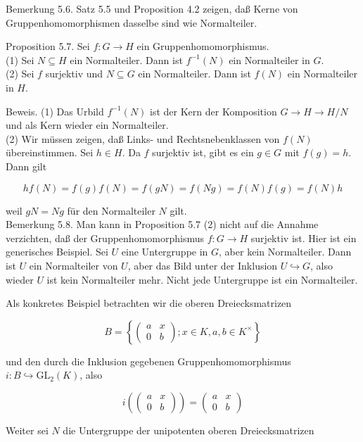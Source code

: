 \documentclass[10pt, letterpaper]{article}
\begin{document}
Bemerkung 5.6. Satz 5.5 und Proposition 4.2 zeigen, daß Kerne von Gruppenhomomorphismen dasselbe sind wie Normalteiler.

Proposition 5.7. Sei $f: G \rightarrow H$ ein Gruppenhomomorphismus.\\
(1) Sei $N \subseteq H$ ein Normalteiler. Dann ist $f^{-1}(N)$ ein Normalteiler in $G$.\\
(2) Sei $f$ surjektiv und $N \subseteq G$ ein Normalteiler. Dann ist $f(N)$ ein Normalteiler in $H$.

Beweis. (1) Das Urbild $f^{-1}(N)$ ist der Kern der Komposition $G \rightarrow H \rightarrow H / N$ und als Kern wieder ein Normalteiler.\\
(2) Wir müssen zeigen, daß Links- und Rechtsnebenklassen von $f(N)$ übereinstimmen. Sei $h \in H$. Da $f$ surjektiv ist, gibt es ein $g \in G$ mit $f(g)=h$. Dann gilt

$$
h f(N)=f(g) f(N)=f(g N)=f(N g)=f(N) f(g)=f(N) h
$$

weil $g N=N g$ für den Normalteiler $N$ gilt.\\
Bemerkung 5.8. Man kann in Proposition 5.7 (2) nicht auf die Annahme verzichten, daß der Gruppenhomomorphismus $f: G \rightarrow H$ surjektiv ist. Hier ist ein generisches Beispiel. Sei $U$ eine Untergruppe in $G$, aber kein Normalteiler. Dann ist $U$ ein Normalteiler von $U$, aber das Bild unter der Inklusion $U \hookrightarrow G$, also wieder $U$ ist kein Normalteiler mehr. Nicht jede Untergruppe ist ein Normalteiler.

Als konkretes Beispiel betrachten wir die oberen Dreiecksmatrizen

$$
B=\left\{\left(\begin{array}{cc}
a & x \\
0 & b
\end{array}\right) ; x \in K, a, b \in K^{\times}\right\}
$$

und den durch die Inklusion gegebenen Gruppenhomomorphismus $i: B \hookrightarrow \mathrm{GL}_{2}(K)$, also

$$
i\left(\left(\begin{array}{ll}
a & x \\
0 & b
\end{array}\right)\right)=\left(\begin{array}{ll}
a & x \\
0 & b
\end{array}\right)
$$

Weiter sei $N$ die Untergruppe der unipotenten oberen Dreiecksmatrizen
\end{document}

